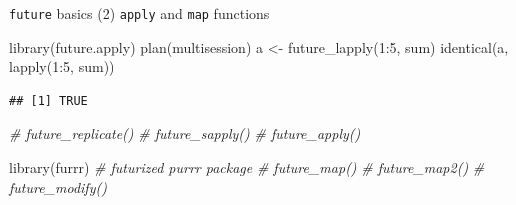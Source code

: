 \documentclass[
  ignorenonframetext,
  usenames,
  dvipsnames]{beamer}
\newenvironment{Shaded}{\begin{snugshade}}{\end{snugshade}}
\newcommand{\CommentTok}[1]{\textcolor[rgb]{0.56,0.35,0.01}{\textit{#1}}}
\newcommand{\DecValTok}[1]{\textcolor[rgb]{0.00,0.00,0.81}{#1}}
\newcommand{\FunctionTok}[1]{\textcolor[rgb]{0.00,0.00,0.00}{#1}}
\newcommand{\NormalTok}[1]{#1}
\newcommand{\OtherTok}[1]{\textcolor[rgb]{0.56,0.35,0.01}{#1}}
\newcommand{\SpecialCharTok}[1]{\textcolor[rgb]{0.00,0.00,0.00}{#1}}
\begin{document}
\begin{frame}[fragile]{\texttt{future} basics (2)}
\protect\hypertarget{future-basics-2}{}
\texttt{apply} and \texttt{map} functions \tiny

\begin{Shaded}
\begin{Highlighting}[]
\FunctionTok{library}\NormalTok{(future.apply)}
\FunctionTok{plan}\NormalTok{(multisession)}
\NormalTok{a }\OtherTok{\textless{}{-}} \FunctionTok{future\_lapply}\NormalTok{(}\DecValTok{1}\SpecialCharTok{:}\DecValTok{5}\NormalTok{, sum)}
\FunctionTok{identical}\NormalTok{(a,}
          \FunctionTok{lapply}\NormalTok{(}\DecValTok{1}\SpecialCharTok{:}\DecValTok{5}\NormalTok{, sum))}
\end{Highlighting}
\end{Shaded}

\begin{verbatim}
## [1] TRUE
\end{verbatim}

\begin{Shaded}
\begin{Highlighting}[]
\CommentTok{\# future\_replicate()}
\CommentTok{\# future\_sapply()}
\CommentTok{\# future\_apply()}

\FunctionTok{library}\NormalTok{(furrr) }\CommentTok{\# futurized \textasciigrave{}purrr\textasciigrave{} package}
\CommentTok{\# future\_map()}
\CommentTok{\# future\_map2()}
\CommentTok{\# future\_modify()}
\end{Highlighting}
\end{Shaded}

\normalsize
\end{frame}
\end{document}
